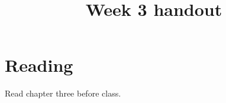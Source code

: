 \documentclass{article}
\title{Week 3 handout}
\begin{document}
\maketitle
\section{Reading}
Read chapter three before class.
\end{document}
